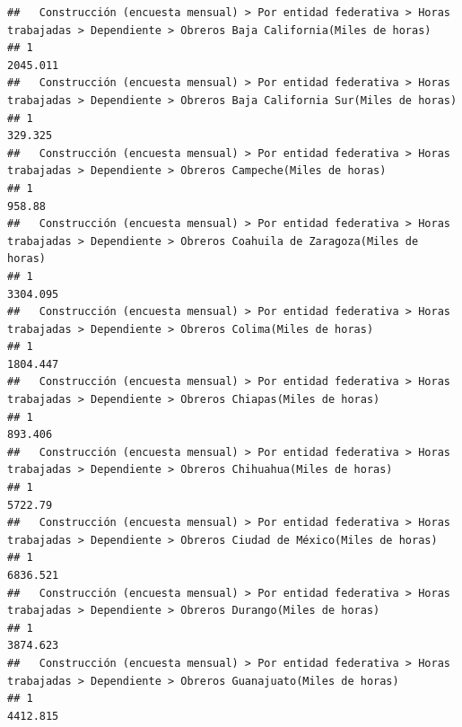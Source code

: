 \documentclass[
]{article}
\begin{document}
\begin{verbatim}
##   Construcción (encuesta mensual) > Por entidad federativa > Horas trabajadas > Dependiente > Obreros Baja California(Miles de horas) 
## 1                                                                                                                             2045.011
##   Construcción (encuesta mensual) > Por entidad federativa > Horas trabajadas > Dependiente > Obreros Baja California Sur(Miles de horas) 
## 1                                                                                                                                  329.325
##   Construcción (encuesta mensual) > Por entidad federativa > Horas trabajadas > Dependiente > Obreros Campeche(Miles de horas) 
## 1                                                                                                                        958.88
##   Construcción (encuesta mensual) > Por entidad federativa > Horas trabajadas > Dependiente > Obreros Coahuila de Zaragoza(Miles de horas) 
## 1                                                                                                                                  3304.095
##   Construcción (encuesta mensual) > Por entidad federativa > Horas trabajadas > Dependiente > Obreros Colima(Miles de horas) 
## 1                                                                                                                    1804.447
##   Construcción (encuesta mensual) > Por entidad federativa > Horas trabajadas > Dependiente > Obreros Chiapas(Miles de horas) 
## 1                                                                                                                      893.406
##   Construcción (encuesta mensual) > Por entidad federativa > Horas trabajadas > Dependiente > Obreros Chihuahua(Miles de horas) 
## 1                                                                                                                        5722.79
##   Construcción (encuesta mensual) > Por entidad federativa > Horas trabajadas > Dependiente > Obreros Ciudad de México(Miles de horas) 
## 1                                                                                                                              6836.521
##   Construcción (encuesta mensual) > Por entidad federativa > Horas trabajadas > Dependiente > Obreros Durango(Miles de horas) 
## 1                                                                                                                     3874.623
##   Construcción (encuesta mensual) > Por entidad federativa > Horas trabajadas > Dependiente > Obreros Guanajuato(Miles de horas) 
## 1                                                                                                                        4412.815

\end{verbatim}
\end{document}
